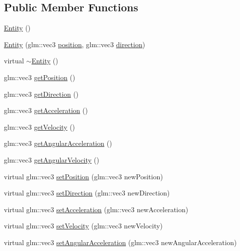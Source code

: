 \subsection*{Public Member Functions}
\begin{DoxyCompactItemize}
\item 
\hyperlink{class_g_g_e_1_1_entity_ade9679d5c915b919e367d785d2a18f70}{Entity} ()
\item 
\hyperlink{class_g_g_e_1_1_entity_a18a84dee351730eac50e79d50e24f354}{Entity} (glm\+::vec3 \hyperlink{class_g_g_e_1_1_entity_a38a9fa01bfaf37ca415181ba6a179d3f}{position}, glm\+::vec3 \hyperlink{class_g_g_e_1_1_entity_a80c69365314541244f26e4a15b4223d8}{direction})
\item 
virtual \hyperlink{class_g_g_e_1_1_entity_ae9ba0e22515e35e0a6f227fb0e302304}{$\sim$\+Entity} ()
\item 
glm\+::vec3 \hyperlink{class_g_g_e_1_1_entity_a306c97f3b5a7658b3437326b4e4f1c43}{get\+Position} ()
\item 
glm\+::vec3 \hyperlink{class_g_g_e_1_1_entity_a66b3121fa59c5b3116d333f9554e5d3c}{get\+Direction} ()
\item 
glm\+::vec3 \hyperlink{class_g_g_e_1_1_entity_ad92f55ba905e45d6a5b2edea65a97174}{get\+Acceleration} ()
\item 
glm\+::vec3 \hyperlink{class_g_g_e_1_1_entity_a4efa4c353b707e71be2915199643a875}{get\+Velocity} ()
\item 
glm\+::vec3 \hyperlink{class_g_g_e_1_1_entity_aaf7d12ccb86dc8e27c0b29eb5a8b1660}{get\+Angular\+Acceleration} ()
\item 
glm\+::vec3 \hyperlink{class_g_g_e_1_1_entity_ab93e0d14ad464bf40ecbe2b0d5407547}{get\+Angular\+Velocity} ()
\item 
virtual glm\+::vec3 \hyperlink{class_g_g_e_1_1_entity_a2281d937a3430a14ec23b9a10b91efcb}{set\+Position} (glm\+::vec3 new\+Position)
\item 
virtual glm\+::vec3 \hyperlink{class_g_g_e_1_1_entity_a5acb66004603256c60d89253002d001c}{set\+Direction} (glm\+::vec3 new\+Direction)
\item 
virtual glm\+::vec3 \hyperlink{class_g_g_e_1_1_entity_a02b81e51dc7a3bc7c61da9ad67b0285a}{set\+Acceleration} (glm\+::vec3 new\+Acceleration)
\item 
virtual glm\+::vec3 \hyperlink{class_g_g_e_1_1_entity_ab787c672dea551a2033bb7c72ab28111}{set\+Velocity} (glm\+::vec3 new\+Velocity)
\item 
virtual glm\+::vec3 \hyperlink{class_g_g_e_1_1_entity_aa6a2c62a4e6ca8e32c4efdc33ce68203}{set\+Angular\+Acceleration} (glm\+::vec3 new\+Angular\+Acceleration)

\end{DoxyCompactItemize}

